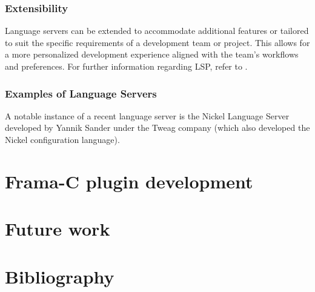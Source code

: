 \documentclass[12pt,a4paper,article]{memoir} %
\begin{document}
\subsection{Extensibility} Language servers can be extended to accommodate additional features or tailored to suit the specific requirements of a development team or project. This allows for a more personalized development experience aligned with the team's workflows and preferences.
For further information regarding LSP, refer to .
\subsection{Examples of Language Servers} A notable instance of a recent language server is the Nickel Language Server developed by Yannik Sander under the Tweag company (which also developed the Nickel configuration language).

\chapter{Frama-C plugin development}
\chapter{Future work}
\chapter{Bibliography}
\printbibliography
\end{document}
